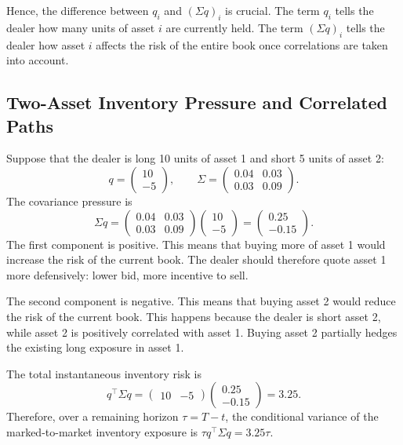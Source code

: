 Hence, the difference between $q_i$ and $(\Sigma q)_i$ is crucial. The term $q_i$ tells the dealer how many units of asset $i$ are currently held. The term $(\Sigma q)_i$ tells the dealer how asset $i$ affects the risk of the entire book once correlations are taken into account.

\subsection{Two-Asset Inventory Pressure and Correlated Paths}

Suppose that the dealer is long 10 units of asset 1 and short 5 units of asset 2:
\[
q=
\begin{pmatrix}
10\\
-5
\end{pmatrix},
\qquad
\Sigma=
\begin{pmatrix}
0.04 & 0.03\\
0.03 & 0.09
\end{pmatrix}.
\]
The covariance pressure is
\[
\Sigma q
=
\begin{pmatrix}
0.04 & 0.03\\
0.03 & 0.09
\end{pmatrix}
\begin{pmatrix}
10\\
-5
\end{pmatrix}
=
\begin{pmatrix}
0.25\\
-0.15
\end{pmatrix}.
\]
The first component is positive. This means that buying more of asset 1 would increase the risk of the current book. The dealer should therefore quote asset 1 more defensively: lower bid, more incentive to sell.

The second component is negative. This means that buying asset 2 would reduce the risk of the current book. This happens because the dealer is short asset 2, while asset 2 is positively correlated with asset 1. Buying asset 2 partially hedges the existing long exposure in asset 1.

The total instantaneous inventory risk is
\[
q^\top\Sigma q
=
\begin{pmatrix}
10 & -5
\end{pmatrix}
\begin{pmatrix}
0.25\\
-0.15
\end{pmatrix}
=
3.25.
\]
Therefore, over a remaining horizon $\tau=T-t$, the conditional variance of the marked-to-market inventory exposure is $\tau q^\top\Sigma q=3.25\tau$.

